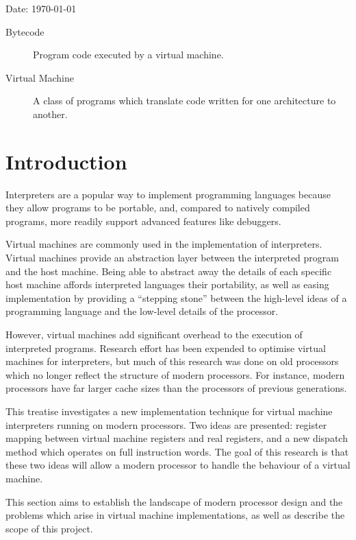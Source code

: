 	Date: \today

\tableofcontents

\begin{description}
	\item[Bytecode] Program code executed by a virtual machine.
	\item[Virtual Machine] A class of programs which translate code written for one architecture to another.
\end{description}


\chapter{Introduction}
	\startrealnumbers
	Interpreters are a popular way to implement programming languages because they allow programs to be portable, and, compared to natively compiled programs, more readily support advanced features like debuggers. 
	
	Virtual machines are commonly used in the implementation of interpreters. Virtual machines provide an abstraction layer between the interpreted program and the host machine. Being able to abstract away the details of each specific host machine affords interpreted languages their portability, as well as easing implementation by providing a ``stepping stone'' between the high-level ideas of a programming language and the low-level details of the processor.
	
	However, virtual machines add significant overhead to the execution of interpreted programs. Research effort has been expended to optimise virtual machines for interpreters, but much of this research was done on old processors which no longer reflect the structure of modern processors. For instance, modern processors have far larger cache sizes than the processors of previous generations.
	
	This treatise investigates a new implementation technique for virtual machine interpreters running on modern processors. Two ideas are presented: register mapping between virtual machine registers and real registers, and a new dispatch method which operates on full instruction words. The goal of this research is that these two ideas will allow a modern processor to handle the behaviour of a virtual machine.
	
	This section aims to establish the landscape of modern processor design and the problems which arise in virtual machine implementations, as well as describe the scope of this project.
	

